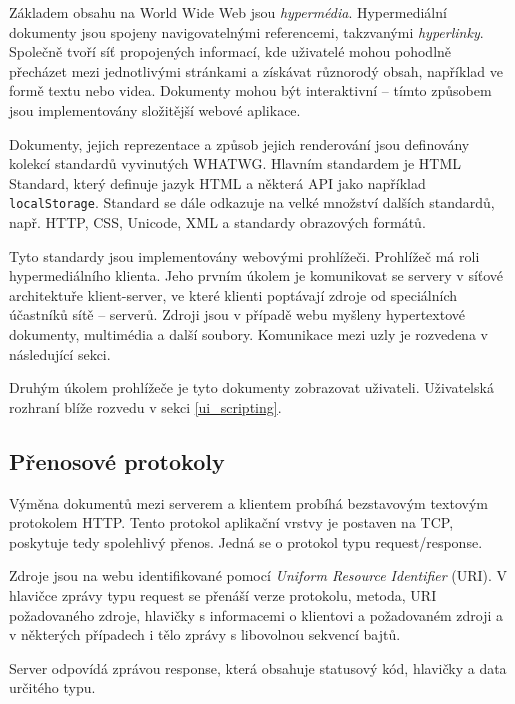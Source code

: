 Základem obsahu na World Wide Web jsou \emph{hypermédia}.
Hypermediální dokumenty jsou spojeny navigovatelnými referencemi, takzvanými \emph{hyperlinky}.
Společně tvoří síť propojených informací, kde uživatelé mohou pohodlně přecházet mezi jednotlivými stránkami a získávat různorodý obsah, například ve formě textu nebo videa.
Dokumenty mohou být interaktivní -- tímto způsobem jsou implementovány složitější webové aplikace.

Dokumenty, jejich reprezentace a způsob jejich renderování jsou definovány kolekcí standardů vyvinutých WHATWG. Hlavním standardem je HTML Standard, který definuje jazyk HTML a některá API jako například \texttt{localStorage}.
Standard se dále odkazuje na velké množství dalších standardů, např. HTTP, CSS, Unicode, XML a standardy obrazových formátů. \cite{htmlStandard}

Tyto standardy jsou implementovány webovými prohlížeči.
Prohlížeč má roli hypermediálního klienta.
Jeho prvním úkolem je komunikovat se servery v síťové architektuře klient-server, ve které klienti poptávají zdroje od speciálních účastníků sítě -- serverů.
Zdroji jsou v případě webu myšleny hypertextové dokumenty, multimédia a další soubory.
Komunikace mezi uzly je rozvedena v následující sekci.

Druhým úkolem prohlížeče je tyto dokumenty zobrazovat uživateli.
Uživatelská rozhraní blíže rozvedu v sekci \ref{ui_scripting}.

\subsection{Přenosové protokoly}

Výměna dokumentů mezi serverem a klientem probíhá bezstavovým textovým protokolem HTTP.
Tento protokol aplikační vrstvy je postaven na TCP, poskytuje tedy spolehlivý přenos.
Jedná se o protokol typu request/response.

Zdroje jsou na webu identifikované pomocí \emph{Uniform Resource Identifier} (URI).
V hlavičce zprávy typu request se přenáší verze protokolu, metoda, URI požadovaného zdroje, hlavičky s informacemi o klientovi a požadovaném zdroji a v některých případech i tělo zprávy s libovolnou sekvencí bajtů.
\cite{http-rfc}

Server odpovídá zprávou response, která obsahuje statusový kód, hlavičky a data určitého typu.

